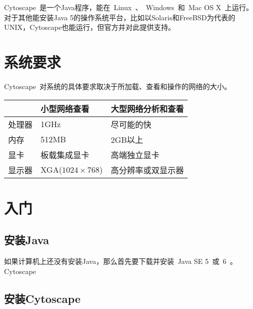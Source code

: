 Cytoscape~是一个Java程序，能在~Linux~、~Windows~和~Mac OS X~上运行。对于其他能安装Java 5的操作系统平台，比如以Solaris和FreeBSD为代表的UNIX，Cytoscape也能运行，但官方并对此提供支持。

\section{系统要求}
	Cytoscape~对系统的具体要求取决于所加载、查看和操作的网络的大小。

	\begin{table}[htbp]
	\label{tabel:2}
	\centering
	\begin{tabular}{|l|l|l|}
	\hline
	 & 小型网络查看 & 大型网络分析和查看 \\
	\hline
	处理器 & 1GHz & 尽可能的快\\
	\hline
	内存   & 512MB & 2GB以上 \\
	\hline
	显卡   & 板载集成显卡 & 高端独立显卡 \\
	\hline
	显示器 & XGA($1024 \times 768$) & 高分辨率或双显示器 \\
	\end{tabular}
	\end{table}

\section{入门}
	\subsection{安装Java}
	如果计算机上还没有安装Java，那么首先要下载并安装~Java SE 5~或~6~。Cytoscape
	\subsection{安装Cytoscape}

